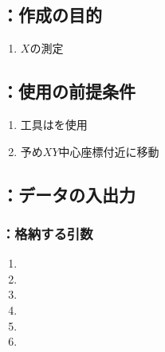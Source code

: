 \clearpage


\subsection{\MXOface：作成の目的}
\begin{enumerate}[label*=\sarrow]
\item \KeywayCenter$X$の測定
\end{enumerate}


\subsection{\MXOface：使用の前提条件}
\begin{enumerate}[label*=\sarrow]
\item 工具は\TouchSensorProbe を使用
\item 予め\KeywayCenter $XY$中心座標付近に移動
\end{enumerate}


\subsection{\MXOface：データの入出力}

\subsubsection{\MXOface：格納する引数}
\begin{enumerate}[label*=\sarrow]
\item \PMACOD
\item \PMKeywayACOD
\item \PMTopReAlocationLength
\item \PMKeywayWidth
\item \PMKeywayPos
\item \PMAsideKeywayDepth
\end{enumerate}


